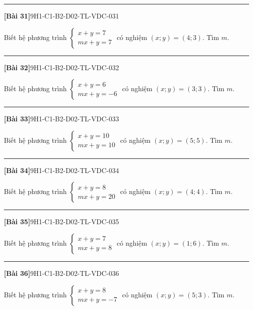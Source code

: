 \documentclass[12pt,a4paper]{article}
\newif\ifloigiai
\newenvironment{cauhoi}[2]{%
  \par\medskip\noindent\rule{\textwidth}{0.4pt}\par\nopagebreak
  \noindent\textbf{[#1]}\hfill{\scriptsize\ttfamily #2}\par\nopagebreak\smallskip}{\par}
\newcommand{\loigiai}[1]{\ifloigiai\par\smallskip\noindent\textit{Lời giải.} #1\par\fi}
\begin{document}
\begin{cauhoi}{Bài 31}{9H1-C1-B2-D02-TL-VDC-031}
Biết hệ phương trình $\begin{cases}x+y=7\\ mx+y=7\end{cases}$ có nghiệm $(x;y)=(4;3)$. Tìm $m$.
\loigiai{Thay $x=4$, $y=3$ vào phương trình thứ hai: $4 m+3=7$ nên $m=\dfrac{7-3}{4}=1$.}
\end{cauhoi}
\begin{cauhoi}{Bài 32}{9H1-C1-B2-D02-TL-VDC-032}
Biết hệ phương trình $\begin{cases}x+y=6\\ mx+y=-6\end{cases}$ có nghiệm $(x;y)=(3;3)$. Tìm $m$.
\loigiai{Thay $x=3$, $y=3$ vào phương trình thứ hai: $3 m+3=-6$ nên $m=\dfrac{-6-3}{3}=-3$.}
\end{cauhoi}
\begin{cauhoi}{Bài 33}{9H1-C1-B2-D02-TL-VDC-033}
Biết hệ phương trình $\begin{cases}x+y=10\\ mx+y=10\end{cases}$ có nghiệm $(x;y)=(5;5)$. Tìm $m$.
\loigiai{Thay $x=5$, $y=5$ vào phương trình thứ hai: $5 m+5=10$ nên $m=\dfrac{10-5}{5}=1$.}
\end{cauhoi}
\begin{cauhoi}{Bài 34}{9H1-C1-B2-D02-TL-VDC-034}
Biết hệ phương trình $\begin{cases}x+y=8\\ mx+y=20\end{cases}$ có nghiệm $(x;y)=(4;4)$. Tìm $m$.
\loigiai{Thay $x=4$, $y=4$ vào phương trình thứ hai: $4 m+4=20$ nên $m=\dfrac{20-4}{4}=4$.}
\end{cauhoi}
\begin{cauhoi}{Bài 35}{9H1-C1-B2-D02-TL-VDC-035}
Biết hệ phương trình $\begin{cases}x+y=7\\ mx+y=8\end{cases}$ có nghiệm $(x;y)=(1;6)$. Tìm $m$.
\loigiai{Thay $x=1$, $y=6$ vào phương trình thứ hai: $1 m+6=8$ nên $m=\dfrac{8-6}{1}=2$.}
\end{cauhoi}
\begin{cauhoi}{Bài 36}{9H1-C1-B2-D02-TL-VDC-036}
Biết hệ phương trình $\begin{cases}x+y=8\\ mx+y=-7\end{cases}$ có nghiệm $(x;y)=(5;3)$. Tìm $m$.
\loigiai{Thay $x=5$, $y=3$ vào phương trình thứ hai: $5 m+3=-7$ nên $m=\dfrac{-7-3}{5}=-2$.}
\end{cauhoi}
\end{document}
